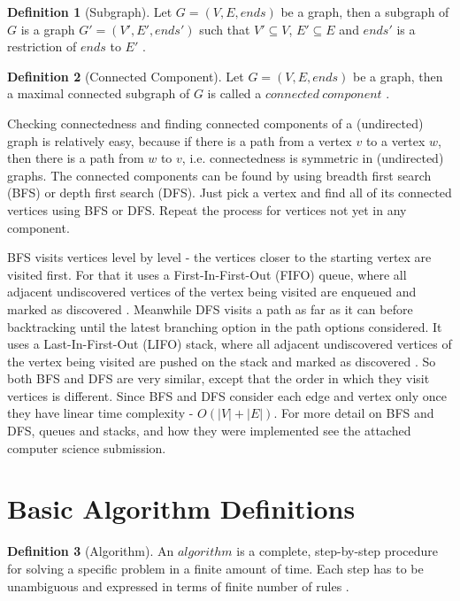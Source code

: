 \documentclass{report}
\theoremstyle{plain}
\theoremstyle{definition}
\newtheorem{definition}{Definition}
\theoremstyle{remark}
\numberwithin{definition}{chapter}
\numberwithin{example}{chapter}
\numberwithin{figure}{chapter}
\numberwithin{theorem}{chapter}
\numberwithin{lemma}{chapter}
\begin{document}
\begin{definition}[Subgraph]
Let $G = (V, E, ends)$ be a graph, then a subgraph of $G$ is a graph $G'=(V', E', ends')$ such that $V' \subseteq V$, $E' \subseteq E$ and $ends'$ is a restriction of $ends$ to $E'$ \cite{bondy2008graph}.
\end{definition}

\begin{definition}[Connected Component]
Let $G = (V, E, ends)$ be a graph, then a maximal connected subgraph of $G$ is called a $connected \ component$ \cite{bollobas1998modern}.
\end{definition}

Checking connectedness and finding connected components of a (undirected) graph is relatively easy, because if there is a path from a vertex $v$ to a vertex $w$, then there is a path from $w$ to $v$, i.e. connectedness is symmetric in (undirected) graphs. The connected components can be found by using breadth first search (BFS) or depth first search (DFS). Just pick a vertex and find all of its connected vertices using BFS or DFS. Repeat the process for vertices not yet in any component.

BFS visits vertices level by level - the vertices closer to the starting vertex are visited first. For that it uses a First-In-First-Out (FIFO) queue, where all adjacent undiscovered vertices of the vertex being visited are enqueued and marked as discovered \cite{c++_sedgewick}. Meanwhile DFS visits a path as far as it can before backtracking until the latest branching option in the path options considered. It uses a Last-In-First-Out (LIFO) stack, where all adjacent undiscovered vertices of the vertex being visited are pushed on the stack and marked as discovered \cite{c++_sedgewick}. So both BFS and DFS are very similar, except that the order in which they visit vertices is different. Since BFS and DFS consider each edge and vertex only once they have linear time complexity - $O(|V| + |E|)$. For more detail on BFS and DFS, queues and stacks, and how they were implemented see the attached computer science submission.

\section{Basic Algorithm Definitions}

\begin{definition}[Algorithm]
An $algorithm$ is a complete, step-by-step procedure for solving a specific problem in a finite amount of time. Each step has to be unambiguous and expressed in terms of finite number of rules \cite{berman1996fundamentals}.
\end{definition}
\end{document}
